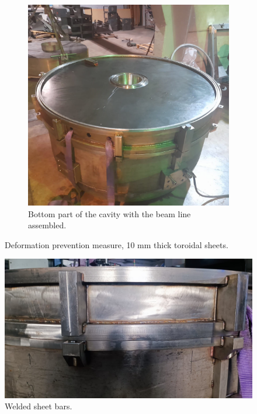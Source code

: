 \documentclass[a4paper,oneside,12pt]{report}
\numberwithin{equation}{chapter}
\begin{document}
\begin{figure}
\begin{subfigure}{.5\textwidth}
      \includegraphics[width=.96\linewidth]{./figures/manif/toroidal_sheets/rhodo_middle_toroidal_sheets_welded_cropped.jpeg}
      \caption{Bottom part of the cavity with the beam line assembled.}
    \end{subfigure}
    \caption{Deformation prevention measure, 10 mm thick toroidal sheets.}
    \label{fig:manif_toroidal_sheets}
\end{figure}

\begin{figure}
    \captionsetup{justification=centering}
    \centering
    \includegraphics[width=.8\linewidth]{./figures/manif/welding/rhodo_middle_sheetbars_cropped.jpeg}
    \caption{Welded sheet bars.}
\end{figure}
\end{document}
